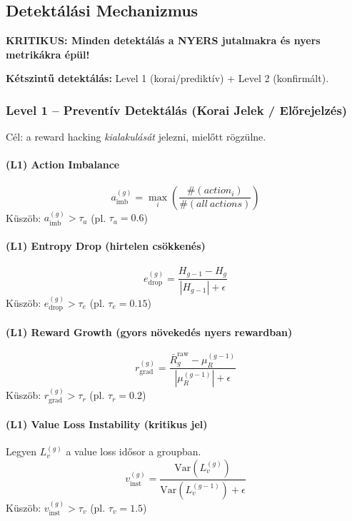 \documentclass{article}
\begin{document}
\subsection{Detektálási Mechanizmus}

\textbf{KRITIKUS: Minden detektálás a NYERS jutalmakra és nyers metrikákra épül!}

\textbf{Kétszintű detektálás:} Level 1 (korai/prediktív) + Level 2 (konfirmált).

\subsubsection{Level 1 -- Preventív Detektálás (Korai Jelek / Előrejelzés)}
Cél: a reward hacking \textit{kialakulását} jelezni, mielőtt rögzülne.

\paragraph{(L1) Action Imbalance}
\begin{equation}
a_{\text{imb}}^{(g)} = \max_i \left(\frac{\#(action_i)}{\#(all\ actions)}\right)
\end{equation}
Küszöb: $a_{\text{imb}}^{(g)} > \tau_a$ (pl. $\tau_a=0.6$)

\paragraph{(L1) Entropy Drop (hirtelen csökkenés)}
\begin{equation}
e_{\text{drop}}^{(g)} = \frac{H_{g-1} - H_g}{|H_{g-1}| + \epsilon}
\end{equation}
Küszöb: $e_{\text{drop}}^{(g)} > \tau_e$ (pl. $\tau_e=0.15$)

\paragraph{(L1) Reward Growth (gyors növekedés nyers rewardban)}
\begin{equation}
r_{\text{grad}}^{(g)} = \frac{\bar{R}_g^{\text{raw}} - \mu_R^{(g-1)}}{|\mu_R^{(g-1)}|+\epsilon}
\end{equation}
Küszöb: $r_{\text{grad}}^{(g)} > \tau_r$ (pl. $\tau_r=0.2$)

\paragraph{(L1) Value Loss Instability (kritikus jel)}
Legyen $L_v^{(g)}$ a value loss idősor a groupban.
\begin{equation}
v_{\text{inst}}^{(g)} = \frac{\mathrm{Var}(L_v^{(g)})}{\mathrm{Var}(L_v^{(g-1)})+\epsilon}
\end{equation}
Küszöb: $v_{\text{inst}}^{(g)} > \tau_v$ (pl. $\tau_v=1.5$)
\end{document}
